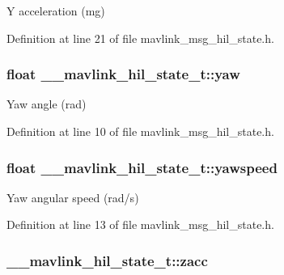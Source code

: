 Y acceleration (mg) 



Definition at line 21 of file mavlink\-\_\-msg\-\_\-hil\-\_\-state.\-h.

\hypertarget{struct____mavlink__hil__state__t_aa7a7dfae39434c0c51492cb2d5614863}{
\subsubsection[{yaw}]{\setlength{\rightskip}{0pt plus 5cm}float \-\_\-\-\_\-mavlink\-\_\-hil\-\_\-state\-\_\-t\-::yaw}}\label{struct____mavlink__hil__state__t_aa7a7dfae39434c0c51492cb2d5614863}


Yaw angle (rad) 



Definition at line 10 of file mavlink\-\_\-msg\-\_\-hil\-\_\-state.\-h.

\hypertarget{struct____mavlink__hil__state__t_a50f16fd863e535867c95fabcfef2e498}{
\subsubsection[{yawspeed}]{\setlength{\rightskip}{0pt plus 5cm}float \-\_\-\-\_\-mavlink\-\_\-hil\-\_\-state\-\_\-t\-::yawspeed}}\label{struct____mavlink__hil__state__t_a50f16fd863e535867c95fabcfef2e498}


Yaw angular speed (rad/s) 



Definition at line 13 of file mavlink\-\_\-msg\-\_\-hil\-\_\-state.\-h.

\hypertarget{struct____mavlink__hil__state__t_a79b626e6b13844d733a6a6c02e506b90}{
\subsubsection[{zacc}]{ \-\_\-\-\_\-mavlink\-\_\-hil\-\_\-state\-\_\-t\-::zacc}}\label{struct____mavlink__hil__state__t_a79b626e6b13844d733a6a6c02e506b90}


